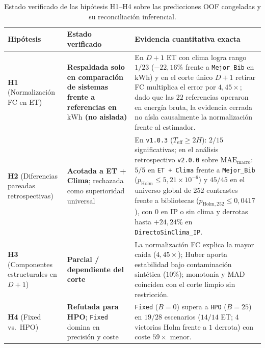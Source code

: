 \begin{table}[!htbp]
\caption{Estado verificado de las hipótesis H1--H4 sobre las predicciones OOF congeladas y su reconciliación inferencial.}\label{tab:res_hipotesis}
\scriptsize
\setlength{\tabcolsep}{3.5pt}
\begin{tabular}{@{}p{2.3cm}p{2.7cm}p{6.5cm}@{}}
\toprule
Hipótesis & Estado verificado & Evidencia cuantitativa exacta \\
\midrule
\textbf{H1} (Normalización FC en ET) & \textbf{Respaldada solo en comparación de sistemas frente a referencias en $\text{kWh}$ (no aislada)} & En $D+1$ ET con clima logra rango $1/23$ ($-22{,}16\%$ frente a \texttt{Mejor\_Bib} en $\text{kWh}$) y en el corte único $D+1$ retirar FC multiplica el error por $4{,}45\times$; dado que las $22$ referencias operaron en energía bruta, la evidencia cerrada no aísla causalmente la normalización frente al estimador. \\
\textbf{H2} (Diferencias pareadas retrospectivas) & \textbf{Acotada a ET + Clima}; rechazada como superioridad universal & En \texttt{v1.0.3} ($T_{\mathrm{eff}} \ge 2H$): $2/15$ significativas; en el análisis retrospectivo \texttt{v2.0.0} sobre $\mathrm{MAE}_{\mathrm{macro}}$: $5/5$ en \texttt{ET + Clima} frente a \texttt{Mejor\_Bib} ($p_{\mathrm{Holm}} \le 5{,}21\times 10^{-6}$) y $45/45$ en el universo global de $252$ contrastes frente a bibliotecas ($p_{\mathrm{Holm,252}} \le 0{,}0417$), con $0$ en IP o sin clima y derrotas hasta $+24{,}24\%$ en \texttt{DirectoSinClima\_IP}. \\
\textbf{H3} (Componentes estructurales en $D+1$) & \textbf{Parcial / dependiente del corte} & La normalización FC explica la mayor caída ($4{,}45\times$); Huber aporta estabilidad bajo contaminación sintética ($10\%$); monotonía y MAD coinciden con el corte limpio sin restricción. \\
\textbf{H4} (Fixed vs.\ HPO) & \textbf{Refutada para HPO}; \texttt{Fixed} domina en precisión y coste & \texttt{Fixed} ($B=0$) supera a \texttt{HPO} ($B=25$) en $19/28$ escenarios ($14/14$ ET; $4$ victorias Holm frente a $1$ derrota) con coste $59\times$ menor. \\
\bottomrule
\end{tabular}
\end{table}
